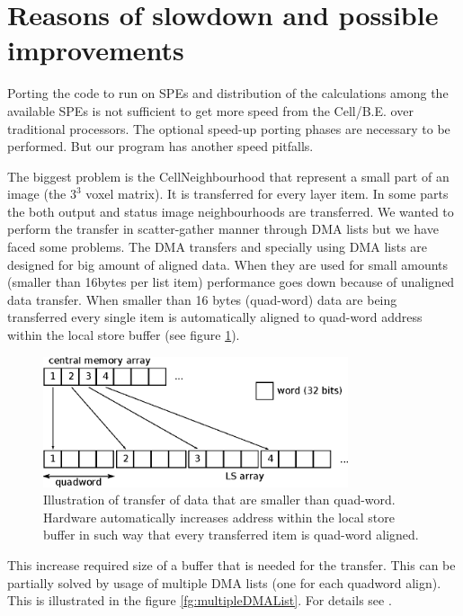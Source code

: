 \section{Reasons of slowdown and possible improvements}

\par
Porting the code to run on SPEs and distribution of the calculations among the available SPEs is not sufficient to get more speed from the \mbox{Cell/B.E.} over traditional processors.
The optional speed-up porting phases are necessary to be performed.
But our program has another speed pitfalls.

\par
The biggest problem is the \mbox{CellNeighbourhood} that represent a small part of an image (the $3^3$ voxel matrix).
It is transferred for every layer item.
In some parts the both output and status image neighbourhoods are transferred.
We wanted to perform the transfer in scatter-gather manner through DMA lists but we have faced some problems.
The DMA transfers and specially using DMA lists are designed for big amount of aligned data.
When they are used for small amounts (smaller than 16bytes per list item) performance goes down because of unaligned data transfer.
When smaller than 16 bytes (quad-word) data are being transferred every single item is automatically aligned to quad-word address within the local store buffer (see figure \ref{fg:automaticAlignOfSmallData}).

\begin{figure}
    \centering
    \includegraphics[width=0.8\textwidth]{data/automaticAlignOfSmallData}
    \caption[Automatic align of small data]
{
  Illustration of transfer of data that are smaller than quad-word.
  Hardware automatically increases address within the local store buffer in such way that every transferred item is quad-word aligned.
}
    \label{fg:automaticAlignOfSmallData}
\end{figure}

This increase required size of a buffer that is needed for the transfer.
This can be partially solved by usage of multiple DMA lists (one for each quadword align).
This is illustrated in the figure \ref{fg:multipleDMAList}.
For details see \cite{DMAListIssues}.

